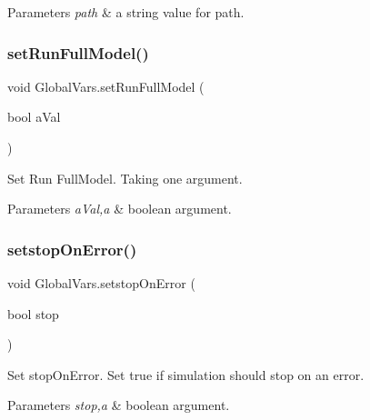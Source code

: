 \begin{DoxyParams}{Parameters}
{\em path} & a string value for path. \\
\hline
\end{DoxyParams}
\mbox{\label{class_global_vars_ab3a4996343d225c668511fb607588ee6}} 
\subsubsection{\texorpdfstring{setRunFullModel()}{setRunFullModel()}}
{\footnotesize\ttfamily void Global\+Vars.\+set\+Run\+Full\+Model (\begin{DoxyParamCaption}\item[{bool}]{a\+Val }\end{DoxyParamCaption})\hspace{0.3cm}{\ttfamily [inline]}}



Set Run Full\+Model. Taking one argument. 


\begin{DoxyParams}{Parameters}
{\em a\+Val,a} & boolean argument. \\
\hline
\end{DoxyParams}
\mbox{\label{class_global_vars_ac8f9c5d7b120a129ca545b072ed7d178}} 
\subsubsection{\texorpdfstring{setstopOnError()}{setstopOnError()}}
{\footnotesize\ttfamily void Global\+Vars.\+setstop\+On\+Error (\begin{DoxyParamCaption}\item[{bool}]{stop }\end{DoxyParamCaption})\hspace{0.3cm}{\ttfamily [inline]}}



Set stop\+On\+Error. Set true if simulation should stop on an error. 


\begin{DoxyParams}{Parameters}
{\em stop,a} & boolean argument. \\
\hline
\end{DoxyParams}
\mbox{\label{class_global_vars_ab73daa54d4af7b798bb13364b91c6026}} 
